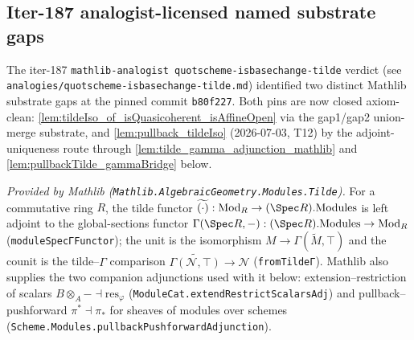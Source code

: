 \subsection{Iter-187 analogist-licensed named substrate gaps}
\label{sec:quot_analogist_gaps}

The iter-187 \texttt{mathlib-analogist quotscheme-isbasechange-tilde}
verdict (see \texttt{analogies/quotscheme-isbasechange-tilde.md})
identified two distinct Mathlib substrate gaps at the pinned commit
\texttt{b80f227}. Both pins are now closed axiom-clean:
\cref{lem:tildeIso_of_isQuasicoherent_isAffineOpen} via the gap1/gap2
union-merge substrate, and \cref{lem:pullback_tildeIso} (2026-07-03,
T12) by the adjoint-uniqueness route through
\cref{lem:tilde_gamma_adjunction_mathlib} and
\cref{lem:pullbackTilde_gammaBridge} below.

\begin{lemma}
  \label{lem:tilde_gamma_adjunction_mathlib}
  \mathlibok
  \textit{Provided by Mathlib (\texttt{Mathlib.AlgebraicGeometry.Modules.Tilde}).}
  For a commutative ring \(R\), the tilde functor
  \(\widetilde{(\cdot)} : \mathrm{Mod}_{R} \to (\Spec R).\mathrm{Modules}\)
  is left adjoint to the global-sections functor
  \(\Gamma(\Spec R, -) : (\Spec R).\mathrm{Modules} \to \mathrm{Mod}_{R}\)
  (\texttt{moduleSpecΓFunctor}); the unit is the isomorphism
  \(M \to \Gamma(\widetilde M, \top)\) and the counit is the
  tilde--\(\Gamma\) comparison
  \(\widetilde{\Gamma(\mathcal N, \top)} \to \mathcal N\)
  (\texttt{fromTildeΓ}). Mathlib also supplies the two companion
  adjunctions used with it below: extension--restriction of scalars
  \(B \otimes_A - \dashv \mathrm{res}_\varphi\)
  (\texttt{ModuleCat.extendRestrictScalarsAdj}) and
  pullback--pushforward \(\pi^* \dashv \pi_*\) for sheaves of modules
  over schemes (\texttt{Scheme.Modules.pullbackPushforwardAdjunction}).
\end{lemma}

